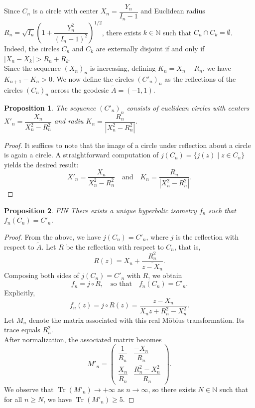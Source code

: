 \documentclass[11pt]{amsart}
\newtheorem{prp}{Proposition}
\begin{document}
Since $C_n$ is a circle with center $X_n = \dfrac{Y_n}{I_n - 1}$ and Euclidean radius 
$R_n = \sqrt{I_n}\left( 1 + \dfrac{Y_n^2}{(I_n - 1)^2} \right)^{1/2}$,
there exists $k \in \mathbb{N}$ such that $C_n \cap C_k = \emptyset$. 
Indeed, the circles $C_n$ and $C_k$ are externally disjoint if and only if 
$|X_n - X_k| > R_n + R_k.$\\
Since the sequence $(X_n)_n$ is increasing, defining $K_n = X_n - R_n$, we have $K_{n+1} - K_n > 0.$
We now define the circles $(C'_n)_n$ as the reflections of the circles $(C_n)_n$ across the geodesic $\tilde{A} = (-1,1)$.

\begin{prp}
The sequence $(C'_n)_n$ consists of euclidean circles with centers $X'_n = \dfrac{X_n}{X_n^2 - R_n^2}$ and radiu $K_n = \dfrac{R_n}{|X_n^2 - R_n^2|}.$
\end{prp}

\begin{proof}
It suffices to note that the image of a circle under reflection about a circle is again a circle. 
A straightforward computation of $j(C_n) = \{ j(z) \mid z \in C_n \}$ yields the desired result:
\[
X'_n = \frac{X_n}{X_n^2 - R_n^2}
\quad \text{and} \quad
K_n = \frac{R_n}{|X_n^2 - R_n^2|}.
\]
\end{proof}

\begin{prp}{FIN}
There exists a unique hyperbolic isometry $f_n$ such that $f_n(C_n) = C'_n$.
\end{prp}

\begin{proof}
From the above, we have $j(C_n) = C'_n$, where $j$ is the reflection with respect to $\tilde{A}$. 
Let $R$ be the reflection with respect to $C_n$, that is,
\[
R(z) = X_n + \frac{R_n^2}{\overline{z - X_n}}.
\]
Composing both sides of $j(C_n) = C'_n$ with $R$, we obtain
\[
f_n = j \circ R, \quad \text{so that} \quad f_n(C_n) = C'_n.
\]
Explicitly,
\[
f_n(z) = j \circ R(z) = \frac{z - X_n}{X_n z + R_n^2 - X_n^2}.
\]
Let $M_n$ denote the matrix associated with this real Möbius transformation. 
Its trace equals $R_n^2$.\\
After normalization, the associated matrix becomes
\[
M'_n =
\begin{pmatrix}
\dfrac{1}{R_n} & \dfrac{-X_n}{R_n} \\[4pt]
\dfrac{X_n}{R_n} & \dfrac{R_n^2 - X_n^2}{R_n}
\end{pmatrix}.
\]
We observe that $\operatorname{Tr}(M'_n) \to +\infty$ as $n \to \infty$, so there exists $N \in \mathbb{N}$ such that for all $n \geq N$, we have $\operatorname{Tr}(M'_n) \geq 5$.
\end{proof}
\end{document}
